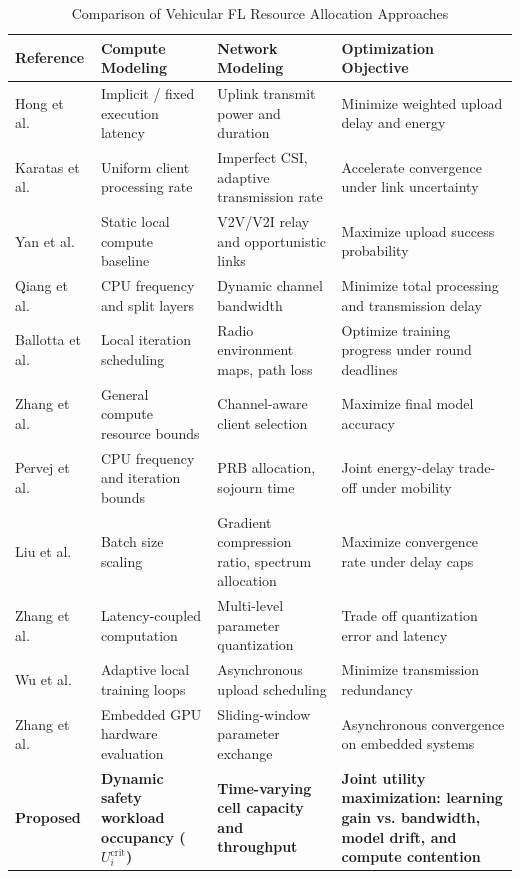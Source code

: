 \documentclass[conference]{IEEEtran}
\begin{document}
\begin{table}[t]
\caption{Comparison of Vehicular FL Resource Allocation Approaches}
\label{tab:related_work}
\centering
\begin{tabular}{lp{4.2cm}p{4.2cm}p{4.5cm}}
\toprule
\textbf{Reference} & \textbf{Compute Modeling} & \textbf{Network Modeling} & \textbf{Optimization Objective} \\
\midrule
Hong et al.~\cite{ref_hong} & Implicit / fixed execution latency & Uplink transmit power and duration & Minimize weighted upload delay and energy \\
Karatas et al.~\cite{ref_karatas} & Uniform client processing rate & Imperfect CSI, adaptive transmission rate & Accelerate convergence under link uncertainty \\
Yan et al.~\cite{ref_yan} & Static local compute baseline & V2V/V2I relay and opportunistic links & Maximize upload success probability \\
Qiang et al.~\cite{ref_qiang} & CPU frequency and split layers & Dynamic channel bandwidth & Minimize total processing and transmission delay \\
Ballotta et al.~\cite{ref_ballotta} & Local iteration scheduling & Radio environment maps, path loss & Optimize training progress under round deadlines \\
Zhang et al.~\cite{ref_zhang_selection} & General compute resource bounds & Channel-aware client selection & Maximize final model accuracy \\
Pervej et al.~\cite{ref_pervej} & CPU frequency and iteration bounds & PRB allocation, sojourn time & Joint energy-delay trade-off under mobility \\
Liu et al.~\cite{ref_liu} & Batch size scaling & Gradient compression ratio, spectrum allocation & Maximize convergence rate under delay caps \\
Zhang et al.~\cite{ref_zhang_quant} & Latency-coupled computation & Multi-level parameter quantization & Trade off quantization error and latency \\
Wu et al.~\cite{ref_wu} & Adaptive local training loops & Asynchronous upload scheduling & Minimize transmission redundancy \\
Zhang et al.~\cite{ref_zhang_automotive} & Embedded GPU hardware evaluation & Sliding-window parameter exchange & Asynchronous convergence on embedded systems \\
\textbf{Proposed} & \textbf{Dynamic safety workload occupancy ($U_i^{\text{crit}}$)} & \textbf{Time-varying cell capacity and throughput} & \textbf{Joint utility maximization: learning gain vs. bandwidth, model drift, and compute contention} \\
\bottomrule
\end{tabular}
\end{table}
\end{document}

